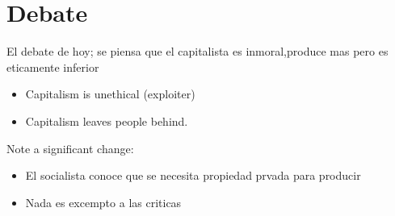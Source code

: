 \section{Debate}
El debate de hoy; se piensa que el capitalista es inmoral,produce mas pero es eticamente inferior \newline 
\begin{itemize}
    \item Capitalism is unethical (exploiter)
    \item Capitalism leaves people behind.
\end{itemize}
Note a significant change:
\begin{itemize}
    \item El socialista conoce que se necesita propiedad prvada para producir
    \item Nada es excempto a las criticas
\end{itemize}


